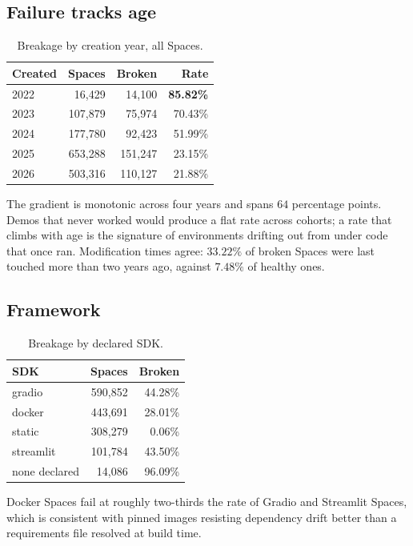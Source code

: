 \documentclass[11pt]{article}
\begin{document}
\subsection{Failure tracks age}

\begin{table}[h]
\centering
\small
\begin{tabular}{lrrr}
\toprule
Created & Spaces & Broken & Rate \\
\midrule
2022 & 16{,}429 & 14{,}100 & \textbf{85.82\%} \\
2023 & 107{,}879 & 75{,}974 & 70.43\% \\
2024 & 177{,}780 & 92{,}423 & 51.99\% \\
2025 & 653{,}288 & 151{,}247 & 23.15\% \\
2026 & 503{,}316 & 110{,}127 & 21.88\% \\
\bottomrule
\end{tabular}
\caption{Breakage by creation year, all Spaces.}
\label{tab:cohort}
\end{table}

The gradient is monotonic across four years and spans $64$ percentage points.
Demos that never worked would produce a flat rate across cohorts; a rate that
climbs with age is the signature of environments drifting out from under code
that once ran. Modification times agree: $33.22\%$ of broken Spaces were last
touched more than two years ago, against $7.48\%$ of healthy ones.

\subsection{Framework}

\begin{table}[h]
\centering
\small
\begin{tabular}{lrr}
\toprule
SDK & Spaces & Broken \\
\midrule
gradio & 590{,}852 & 44.28\% \\
docker & 443{,}691 & 28.01\% \\
static & 308{,}279 & 0.06\% \\
streamlit & 101{,}784 & 43.50\% \\
none declared & 14{,}086 & 96.09\% \\
\bottomrule
\end{tabular}
\caption{Breakage by declared SDK.}
\label{tab:sdk}
\end{table}

Docker Spaces fail at roughly two-thirds the rate of Gradio and Streamlit
Spaces, which is consistent with pinned images resisting dependency drift
better than a requirements file resolved at build time.
\end{document}
